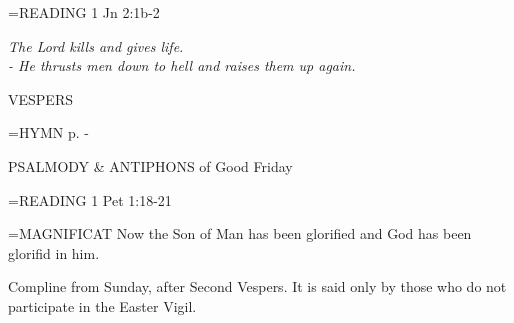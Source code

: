 \hangindent=\parindent \small{\uppercase{READING}}    1 Jn 2:1b-2 \textbf{   \\}

\begin{center}
\textit{The Lord kills and gives life.\\
- He thrusts men down to hell and raises them up again.}
\end{center}

\begin{flushleft}\normalsize VESPERS\\\end{flushleft}

\hangindent=\parindent \small{\uppercase{HYMN} p. \pageref{lent:firstHymn}-\pageref{lent:lastHymn}\\}

PSALMODY \& ANTIPHONS of Good Friday

\hangindent=\parindent \small{\uppercase{READING}}    1 Pet 1:18-21 \textbf{   \\}

\hangindent=\parindent \small{MAGNIFICAT 	Now the Son of Man has been glorified and God has been glorifid in him.\\}

Compline from Sunday, after Second Vespers. It is said only by those who do not participate in the Easter Vigil.
